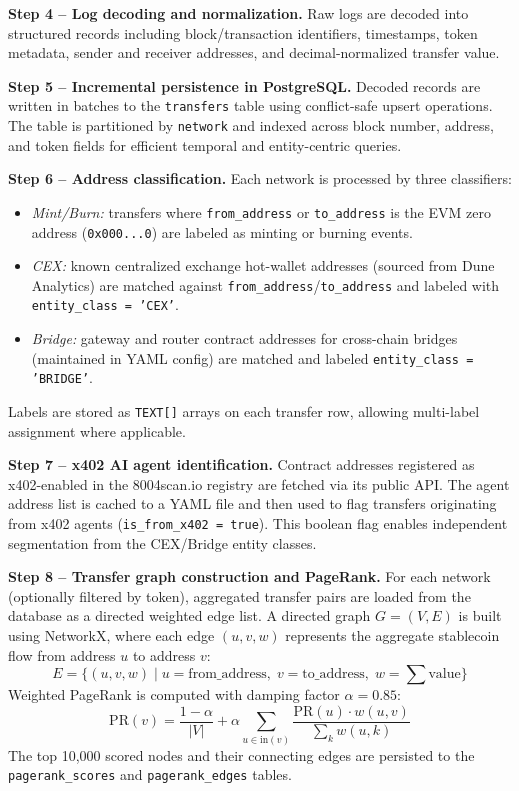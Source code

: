 \documentclass[a4paper,12pt]{report}
\begin{document}
\textbf{Step 4 -- Log decoding and normalization.}
Raw logs are decoded into structured records including block/transaction identifiers, timestamps,
token metadata, sender and receiver addresses, and decimal-normalized transfer value.

\textbf{Step 5 -- Incremental persistence in PostgreSQL.}
Decoded records are written in batches to the \texttt{transfers} table using conflict-safe upsert
operations. The table is partitioned by \texttt{network} and indexed across block number, address,
and token fields for efficient temporal and entity-centric queries.

\textbf{Step 6 -- Address classification.}
Each network is processed by three classifiers:
\begin{itemize}
    \item \textit{Mint/Burn:} transfers where \texttt{from\_address} or \texttt{to\_address} is the
    EVM zero address (\texttt{0x000...0}) are labeled as minting or burning events.
    \item \textit{CEX:} known centralized exchange hot-wallet addresses (sourced from Dune Analytics)
    are matched against \texttt{from\_address}/\texttt{to\_address} and labeled with
    \texttt{entity\_class = 'CEX'}.
    \item \textit{Bridge:} gateway and router contract addresses for cross-chain bridges (maintained
    in YAML config) are matched and labeled \texttt{entity\_class = 'BRIDGE'}.
\end{itemize}
Labels are stored as \texttt{TEXT[]} arrays on each transfer row, allowing multi-label assignment
where applicable.

\textbf{Step 7 -- x402 AI agent identification.}
Contract addresses registered as x402-enabled in the 8004scan.io registry are fetched via its
public API. The agent address list is cached to a YAML file and then used to flag transfers
originating from x402 agents (\texttt{is\_from\_x402 = true}). This boolean flag enables
independent segmentation from the CEX/Bridge entity classes.

\textbf{Step 8 -- Transfer graph construction and PageRank.}
For each network (optionally filtered by token), aggregated transfer pairs are loaded from the
database as a directed weighted edge list. A directed graph $G = (V, E)$ is built using
NetworkX, where each edge $(u, v, w)$ represents the aggregate stablecoin flow from address
$u$ to address $v$:
\[
E = \{(u, v, w) \mid u = \text{from\_address},\; v = \text{to\_address},\; w = \sum \text{value} \}
\]
Weighted PageRank is computed with damping factor $\alpha = 0.85$:
\[
\text{PR}(v) = \frac{1 - \alpha}{|V|} + \alpha \sum_{u \in \text{in}(v)} \frac{\text{PR}(u) \cdot w(u,v)}{\sum_{k} w(u,k)}
\]
The top 10,000 scored nodes and their connecting edges are persisted to the
\texttt{pagerank\_scores} and \texttt{pagerank\_edges} tables.
\end{document}
